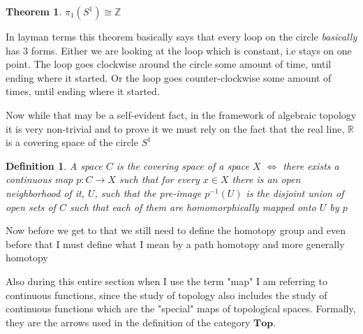 \documentclass[paper=a4,fontsize=paper,12.5pt]{book}
\newcommand{\3}{\vspace*{3mm}}
\newcommand{\IFF}{$\Longleftrightarrow$ \hspace*{.5mm}}
\newcommand{\Z}{\mathbb{Z}}
\newcommand{\R}{\mathbb{R}}
\newcommand{\C}[1]{{S}^{#1}}
\begin{document}
\newtheorem{lemma}{Lemma}
\newtheorem{sublemma}{Lemma}[lemma]
\newtheorem{theorem}{Theorem}
\newtheorem{conjecture}{Conjecture}

\newtheorem{definition}{Definition}[section]
\newtheorem{problem}{Problem}
\newtheorem{corollary}{Corollary}




\begin{theorem}

${\pi}_{1}({{S}^{1}}) \cong \Z$


\end{theorem}


In layman terms this theorem basically says that every loop on the circle \textit{basically} has $3$ forms. Either we are looking at the loop which is constant, i.e stays on one point. The loop goes clockwise around the circle some amount of time, until ending where it started. Or the loop goes counter-clockwise some amount of times, until ending where it started.

\3

Now while that may be a self-evident fact, in the framework of algebraic topology it is very non-trivial and to prove it we must rely on the fact that the real line, $\R$ is a covering space of the circle $\C{1}$

\3

\begin{definition}

A space $C$ is the covering space of a space $X$ \IFF there exists a continuous map $p:C \to X$ such that for every $x \in X$ there is an open neighborhood of it, $U$, such that the pre-image ${p}^{-1}(U)$ is the disjoint union of open sets of $C$ such that each of them are homomorphically mapped onto $U$ by $p$


\end{definition}

\3

Now before we get to that we still need to define the homotopy group and even before that I must define what I mean by a path homotopy and more generally homotopy

\3

Also during this entire section when I use the term "map" I am referring to continuous functions, since the study of topology also includes the study of continuous functions which are the "special" maps of topological spaces. Formally, they are the arrows used in the definition of the category $\mathbf{Top}$.

\3
\end{document}
